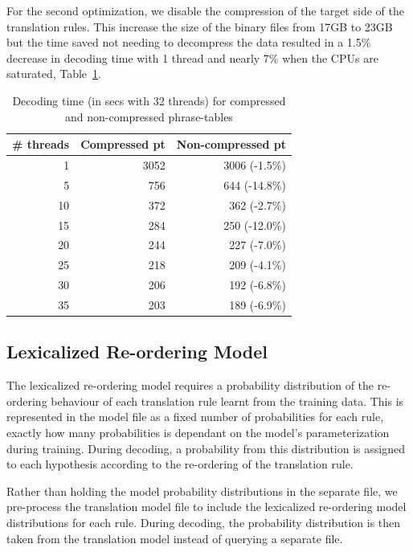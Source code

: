 \documentclass[]{article}
\begin{document}
For the second optimization, we disable the compression of the target side of the translation rules. This increase the size of the binary files from 17GB to 23GB but the time saved not needing to decompress the data resulted in a 1.5\% decrease in decoding time with 1 thread and nearly 7\% when the CPUs are saturated, Table~\ref{tab:compression}.
\begin{table}[h]
\small
\begin{center}
\begin{tabular}{|r|r|r|} \hline
\# threads	& Compressed pt & Non-compressed pt \\ \hline
1		& 3052	& 3006 (-1.5\%) \\
5		& 756	& 644 (-14.8\%) \\
10		& 372	& 362 (-2.7\%) \\
15		& 284	& 250 (-12.0\%) \\
20		& 244	& 227 (-7.0\%) \\
25		& 218	& 209 (-4.1\%) \\
30		& 206	& 192 (-6.8\%) \\
35		& 203	& 189 (-6.9\%) \\ \hline
\end{tabular}
\end{center}
\caption{Decoding time (in secs with 32 threads) for compressed and non-compressed phrase-tables}
\label{tab:compression}
\end{table}

\subsection{Lexicalized Re-ordering Model}

The lexicalized re-ordering model requires a probability distribution of the re-ordering behaviour of each translation rule learnt from the training data. This is represented in the model file as a fixed number of probabilities for each rule, exactly how many probabilities is dependant on the model's parameterization during training. During decoding, a probability from this distribution is assigned to each hypothesis according to the re-ordering of the translation rule.

Rather than holding the model probability distributions in the separate file, we pre-process the translation model file to include the lexicalized re-ordering model distributions for each rule. During decoding, the probability distribution is then taken from the translation model instead of querying a separate file. 
\end{document}
